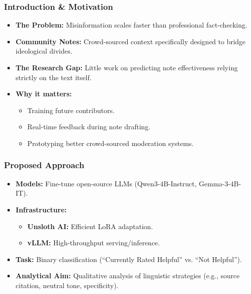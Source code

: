 \documentclass[11pt]{beamer}
\begin{document}
\begin{frame}
    \frametitle{Introduction \& Motivation}
    \begin{itemize}
        \item \textbf{The Problem:} Misinformation scales faster than professional fact-checking.
        \item \textbf{Community Notes:} Crowd-sourced context specifically designed to bridge ideological divides.
        \item \textbf{The Research Gap:} Little work on predicting note effectiveness relying strictly on the text itself.
        \item \textbf{Why it matters:}
        \begin{itemize}
            \item Training future contributors.
            \item Real-time feedback during note drafting.
            \item Prototyping better crowd-sourced moderation systems.
        \end{itemize}
    \end{itemize}
\end{frame}

\begin{frame}
    \frametitle{Proposed Approach}
    \begin{itemize}
        \item \textbf{Models:} Fine-tune open-source LLMs (Qwen3-4B-Instruct, Gemma-3-4B-IT).
        \item \textbf{Infrastructure:}
        \begin{itemize}
            \item \textbf{Unsloth AI:} Efficient LoRA adaptation.
            \item \textbf{vLLM:} High-throughput serving/inference.
        \end{itemize}
        \item \textbf{Task:} Binary classification (``Currently Rated Helpful'' vs. ``Not Helpful'').
        \item \textbf{Analytical Aim:} Qualitative analysis of linguistic strategies (e.g., source citation, neutral tone, specificity).
    \end{itemize}
\end{frame}
\end{document}
